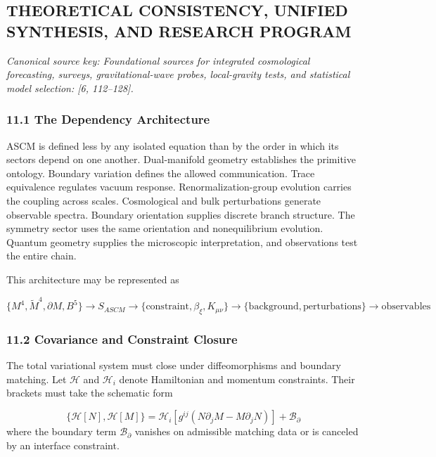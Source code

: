 \documentclass[aps,prd,onecolumn,superscriptaddress,nofootinbib,longbibliography,10pt]{revtex4-2}
\begin{document}
  
\subsection*{THEORETICAL CONSISTENCY, UNIFIED SYNTHESIS, AND RESEARCH PROGRAM}

  \textit{Canonical source key: Foundational sources for integrated cosmological forecasting, surveys, gravitational-wave probes, local-gravity tests, and statistical model selection: [6, 112–128].}


  
\subsubsection*{11.1 The Dependency Architecture}

  ASCM is defined less by any isolated equation than by the order in which its sectors depend on one another. Dual-manifold geometry establishes the primitive ontology. Boundary variation defines the allowed communication. Trace equivalence regulates vacuum response. Renormalization-group evolution carries the coupling across scales. Cosmological and bulk perturbations generate observable spectra. Boundary orientation supplies discrete branch structure. The symmetry sector uses the same orientation and nonequilibrium evolution. Quantum geometry supplies the microscopic interpretation, and observations test the entire chain.


  This architecture may be represented as


  \[ \{M^4, \tilde{M}^4, \partial M, B^5\} \to S_{ASCM} \to \{\text{constraint}, \beta_\xi, K_{\mu\nu}\} \to \{\text{background}, \text{perturbations}\} \to \text{observables} \]

  
\subsubsection*{11.2 Covariance and Constraint Closure}

  The total variational system must close under diffeomorphisms and boundary matching. Let \(\mathcal{H}\) and \(\mathcal{H}_i\) denote Hamiltonian and momentum constraints. Their brackets must take the schematic form


  \[ \{\mathcal{H}[N], \mathcal{H}[M]\} = \mathcal{H}_i[g^{ij}(N\partial_j M - M\partial_j N)] + \mathcal{B}_\partial \]
  where the boundary term \(\mathcal{B}_\partial\) vanishes on admissible matching data or is canceled by an interface constraint.
\end{document}
